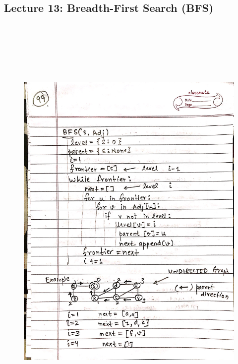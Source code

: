 \newpage
{\color{black} \subsection*{Lecture 13: Breadth-First Search (BFS)}}
\begin{figure}[H]
    \centering
    \includegraphics[width=16cm, height=21cm]{"./MIT-6.006/MIT-6006-099"}
\end{figure}

